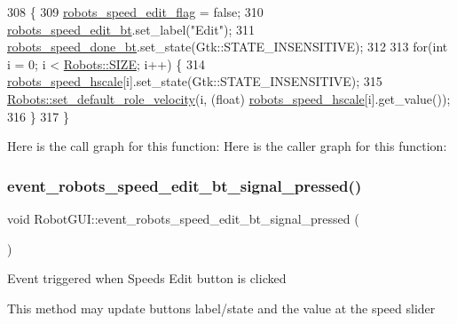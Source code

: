 \begin{DoxyCode}
308                                                         \{
309     \hyperlink{class_robot_g_u_i_a0da216285bd7ded79b85328191d0354d}{robots\_speed\_edit\_flag} = \textcolor{keyword}{false};
310     \hyperlink{class_robot_g_u_i_aeb9008eb20d42d90fe39564179598d6d}{robots\_speed\_edit\_bt}.set\_label(\textcolor{stringliteral}{"Edit"});
311     \hyperlink{class_robot_g_u_i_accc677ab2d9cd534389956e6d41ee55c}{robots\_speed\_done\_bt}.set\_state(Gtk::STATE\_INSENSITIVE);
312 
313     \textcolor{keywordflow}{for}(\textcolor{keywordtype}{int} i = 0; i < \hyperlink{class_robots_ae9df2f1d345ad6740f0459956cdd4712}{Robots::SIZE}; i++) \{
314         \hyperlink{class_robot_g_u_i_a25c9dbce938a0b6fa4de5c7174d062af}{robots\_speed\_hscale}[i].set\_state(Gtk::STATE\_INSENSITIVE);
315         \hyperlink{class_robots_ae167e64868239ece6c9f5b35d6f6ba43}{Robots::set\_default\_role\_velocity}(i, (\textcolor{keywordtype}{float}) 
      \hyperlink{class_robot_g_u_i_a25c9dbce938a0b6fa4de5c7174d062af}{robots\_speed\_hscale}[i].get\_value());
316     \}
317 \}
\end{DoxyCode}
Here is the call graph for this function\+:
Here is the caller graph for this function\+:
\mbox{\label{class_robot_g_u_i_ad3e49c942794d65e38600e7d48681fa1}} 
\subsubsection{\texorpdfstring{event\+\_\+robots\+\_\+speed\+\_\+edit\+\_\+bt\+\_\+signal\+\_\+pressed()}{event\_robots\_speed\_edit\_bt\_signal\_pressed()}}
{\footnotesize\ttfamily void Robot\+G\+U\+I\+::event\+\_\+robots\+\_\+speed\+\_\+edit\+\_\+bt\+\_\+signal\+\_\+pressed (\begin{DoxyParamCaption}{ }\end{DoxyParamCaption})\hspace{0.3cm}{\ttfamily [private]}}

Event triggered when Speeds\textquotesingle{} Edit button is clicked

This method may update buttons\textquotesingle{} label/state and the value at the speed slider 

